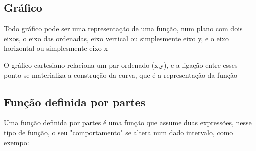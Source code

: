 \begin{multicols*}{2}
            \subsection*{Gráfico}	        
            Todo gráfico pode ser uma representação de uma função, num plano com dois eixos, o eixo das 			ordenadas, eixo vertical ou simplesmente eixo y, e o eixo horizontal ou simplesmente eixo x
            
            O gráfico cartesiano relaciona um par ordenado (x,y), e a ligação entre esses ponto se 					materializa a construção da curva, que é a representação da função
            
                
            
            
            \subsection*{Função definida por partes}
            Uma função definida por partes é uma função que assume duas expressões, nesse tipo de função, o 		seu "comportamento" se altera num dado intervalo, como exempo:
            

\end{multicols*}
